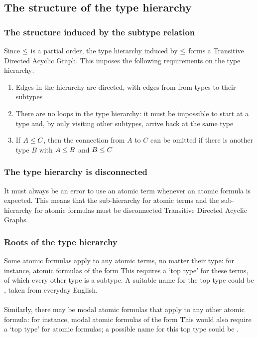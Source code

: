 \documentclass[../main.tex]{subfiles}
\begin{document}
\subsection{The structure of the type hierarchy}
\subsubsection{The structure induced by the subtype relation}
Since $\leq$ is a partial order, the type hierarchy induced by $\leq$ forms a Transitive Directed Acyclic Graph\cite[p.~49]{poset_dag}. This imposes the following requirements on the type hierarchy:
\begin{enumerate}
    \item Edges in the hierarchy are directed, with edges from from types to their subtypes
    \item There are no loops in the type hierarchy: it must be impossible to start at a type and, by only visiting other subtypes, arrive back at the same type
    \item If $A \leq C$, then the connection from $A$ to $C$ can be omitted if there is another type $B$ with $A \leq B$ and $B \leq C$
\end{enumerate}

\subsubsection{The type hierarchy is disconnected}
It must always be an error to use an atomic term whenever an atomic formula is expected. This means that the sub-hierarchy for atomic terms and the sub-hierarchy for atomic formulas must be disconnected Transitive Directed Acyclic Graphs. 

\subsubsection{Roots of the type hierarchy}
Some atomic formulas apply to any atomic terms, no matter their type: for instance, atomic formulas of the form  This requires a `top type' for these terms, of which every other type is a subtype. A suitable name for the top type could be , taken from everyday English. 
\\
\\
Similarly, there may be modal atomic formulas that apply to any other atomic formula: for instance, modal atomic formulas of the form  This would also require a `top type' for atomic formulas; a possible name for this top type could be .
\end{document}
